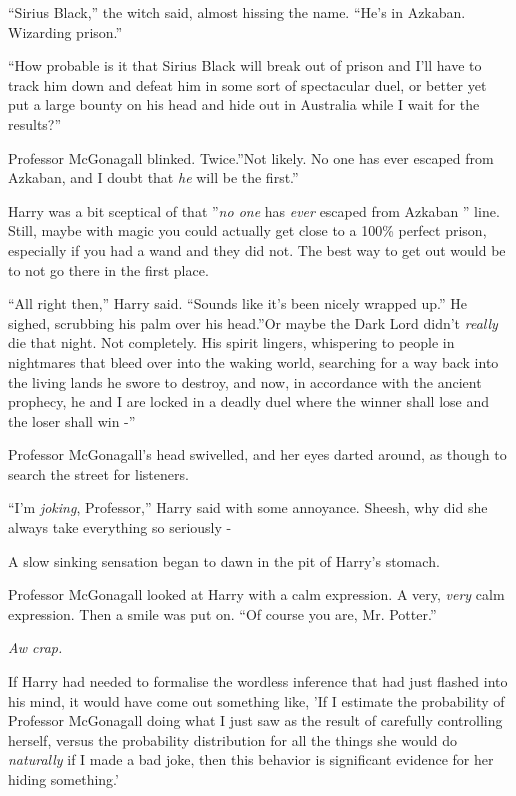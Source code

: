 ``Sirius Black,'' the witch said, almost hissing the name. ``He's in
Azkaban. Wizarding prison.''

``How probable is it that Sirius Black will break out of prison and I'll
have to track him down and defeat him in some sort of spectacular duel,
or better yet put a large bounty on his head and hide out in Australia
while I wait for the results?''

Professor McGonagall blinked. Twice.''Not likely. No one has ever
escaped from Azkaban, and I doubt that \emph{he} will be the first.''

Harry was a bit sceptical of that ''\emph{no one} has \emph{ever} escaped
from Azkaban '' line. Still, maybe with magic you could actually get
close to a 100\% perfect prison, especially if you had a wand and they
did not. The best way to get out would be to not go there in the first
place.

``All right then,'' Harry said. ``Sounds like it's been nicely wrapped
up.'' He sighed, scrubbing his palm over his head.''Or maybe the Dark
Lord didn't \emph{really} die that night. Not completely. His spirit
lingers, whispering to people in nightmares that bleed over into the
waking world, searching for a way back into the living lands he swore to
destroy, and now, in accordance with the ancient prophecy, he and I are
locked in a deadly duel where the winner shall lose and the loser shall
win -''

Professor McGonagall's head swivelled, and her eyes darted around, as
though to search the street for listeners.

``I'm \emph{joking}, Professor,'' Harry said with some annoyance. Sheesh,
why did she always take everything so seriously -

A slow sinking sensation began to dawn in the pit of Harry's stomach.

Professor McGonagall looked at Harry with a calm expression. A very,
\emph{very} calm expression. Then a smile was put on. ``Of course you
are, Mr. Potter.''

\emph{Aw crap.}

If Harry had needed to formalise the wordless inference that had just
flashed into his mind, it would have come out something like, 'If I
estimate the probability of Professor McGonagall doing what I just saw
as the result of carefully controlling herself, versus the probability
distribution for all the things she would do \emph{naturally} if I made
a bad joke, then this behavior is significant evidence for her hiding
something.'

